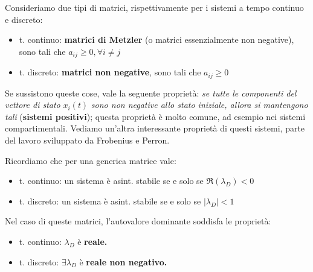 Consideriamo due tipi di matrici, rispettivamente per i sistemi a tempo continuo e discreto:
\begin{itemize}
	\item t. continuo: \textbf{matrici di Metzler} (o matrici essenzialmente non negative), sono tali che $a_{ij} \geq 0,\forall i\neq j$
	\item t. discreto: \textbf{matrici non negative}, sono tali che $a_{ij} \geq 0$
\end{itemize}

Se sussistono queste cose, vale la seguente proprietà: \textit{se tutte le componenti del vettore di stato }$x_i(t)$\textit{ sono non negative allo stato iniziale, allora si mantengono tali} (\textbf{sistemi positivi}); questa proprietà è molto comune, ad esempio nei sistemi compartimentali. Vediamo un'altra interessante proprietà di questi sistemi, parte del lavoro sviluppato da Frobenius e Perron.

Ricordiamo che per una generica matrice vale:
\begin{itemize}
	\item t. continuo: un sistema è asint. stabile se e solo se $\Re(\lambda _D) < 0$
	\item t. discreto: un sistema è asint. stabile se e solo se $| \lambda _D| < 1$
\end{itemize}

Nel caso di queste matrici, l'autovalore dominante soddisfa le proprietà:
\begin{itemize}
	\item t. continuo: $\lambda _D$ è \textbf{reale.}
	\item t. discreto: $\exists \lambda _D$ è \textbf{reale non negativo.}
\end{itemize}

